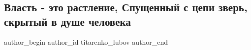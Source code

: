  
 
 
 
 
 
\subsection{Власть - это растление, Спущенный с цепи зверь, скрытый в душе человека}
\label{sec:02_06_2021.fb.titarenko_lubov.1.vlast_chelovek_zver}
\ifcmt
 author_begin
   author_id titarenko_lubov
 author_end
\fi

